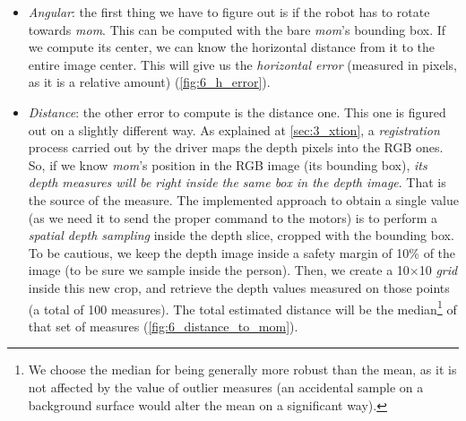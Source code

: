 		\begin{itemize}
			\item \emph{Angular}: the first thing we have to figure out is if the robot has to rotate towards \emph{mom}. This can be computed with the bare \emph{mom}'s bounding box. If we compute its center, we can know the horizontal distance from it to the entire image center. This will give us the \emph{horizontal error} (measured in pixels, as it is a relative amount) (\autoref{fig:6_h_error}).
			
			\item \emph{Distance}: the other error to compute is the distance one. This one is figured out on a slightly different way. As explained at \autoref{sec:3_xtion}, a \emph{registration} process carried out by the driver maps the depth pixels into the RGB ones. So, if we know \emph{mom}'s position in the RGB image (its bounding box), \emph{its depth measures will be right inside the same box in the depth image}. That is the source of the measure. The implemented approach to obtain a single value (as we need it to send the proper command to the motors) is to perform a \emph{spatial depth sampling} inside the depth slice, cropped with the bounding box. To be cautious, we keep the depth image inside a safety margin of 10\% of the image (to be sure we sample inside the person). Then, we create a 10$\times$10 \emph{grid} inside this new crop, and retrieve the depth values measured on those points (a total of 100 measures). The total estimated distance will be the median\footnote{We choose the median for being generally more robust than the mean, as it is not affected by the value of outlier measures (an accidental sample on a background surface would alter the mean on a significant way).} of that set of measures (\autoref{fig:6_distance_to_mom}).
		\end{itemize}
		
